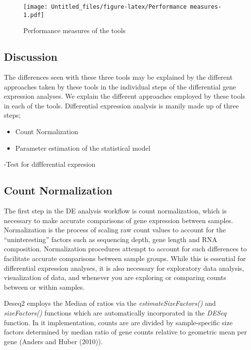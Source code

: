 \documentclass[]{article}
\begin{document}
\begin{figure}
\centering
\texttt{[image: Untitled\_files/figure-latex/Performance measures-1.pdf]}
\caption{Performance measures of the tools}
\end{figure}

\hypertarget{discussion}{%
\subsection{Discussion}\label{discussion}}

The differences seen with these three tools may be explained by the
different approaches taken by these tools in the individual steps of the
differential gene expression analyses. We explain the different
approaches employed by these tools in each of the tools. Differential
expression analysis is manily made up of three steps;

\begin{itemize}
\item
  Count Normalization
\item
  Parameter estimation of the statistical model
\end{itemize}

-Test for diffferential expresion

\hypertarget{count-normalization}{%
\subsection{Count Normalization}\label{count-normalization}}

The first step in the DE analysis workflow is count normalization, which
is necessary to make accurate comparisons of gene expression between
samples. Normalization is the process of scaling raw count values to
account for the ``uninteresting'' factors such as sequencing depth, gene
length and RNA composition. Normalization procedures attempt to account
for such differences to facilitate accurate comparisons between sample
groups. While this is essential for differential expression analyses, it
is also necessary for exploratory data analysis, visualization of data,
and whenever you are exploring or comparing counts between or within
samples.

Deseq2 employs the Median of ratios via the \emph{estimateSizeFactors()}
and \emph{sizeFactors()} functions which are automatically incorporated
in the \emph{DESeq} function. In it implementation, counts are are
divided by sample-specific size factors determined by median ratio of
gene counts relative to geometric mean per gene (Anders and Huber
(2010)).
\end{document}
